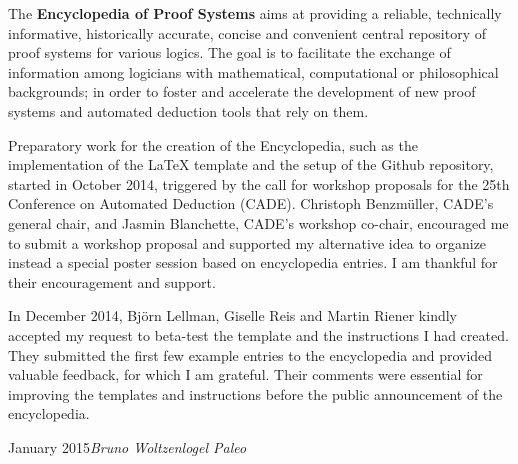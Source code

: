 
\preface

The \textbf{Encyclopedia of Proof Systems} aims at providing a reliable, technically informative, historically accurate, concise and convenient central repository of proof systems for various logics. The goal is to facilitate the exchange of information among logicians with mathematical, computational or philosophical backgrounds; in order to foster and accelerate the development of new proof systems and automated deduction tools that rely on them.

Preparatory work for the creation of the Encyclopedia, such as the implementation of the LaTeX template and the setup of the Github repository, started in October 2014, triggered by the call for workshop proposals for the 25th Conference on Automated Deduction (CADE). Christoph Benzm\"uller, CADE's general chair, and Jasmin Blanchette, CADE's workshop co-chair, encouraged me to submit a workshop proposal and supported my alternative idea to organize instead a special poster session based on encyclopedia entries. I am thankful for their encouragement and support.

In December 2014, Bj\"orn Lellman, Giselle Reis and Martin Riener kindly accepted my request to beta-test the template and the instructions I had created. They submitted the first few example entries to the encyclopedia and provided valuable feedback, for which I am grateful. Their comments were essential for improving the templates and instructions before the public announcement of the encyclopedia.

 

\vspace{\baselineskip}
\begin{flushright}\noindent
January 2015\hfill {\it Bruno Woltzenlogel Paleo}
\end{flushright}


